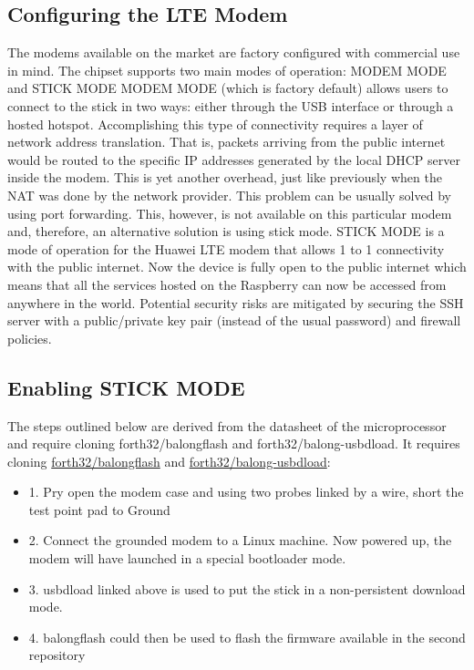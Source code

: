 \documentclass{IEEEtran}
\begin{document}
\subsection*{Configuring the LTE Modem}
The modems available on the market are factory configured with commercial use in mind. The chipset supports two main modes of operation: MODEM MODE and STICK MODE
\newline 
\newline
MODEM MODE (which is factory default) allows users to connect to the stick in two ways: either through the USB interface or through a hosted hotspot. Accomplishing this type of connectivity requires a layer of network address translation. That is, packets arriving from the public internet would be routed to the specific IP addresses generated by the local DHCP server inside the modem. This is yet another overhead, just like previously when the NAT was done by the network provider. This problem can be usually solved by using port forwarding. This, however, is not available on this particular modem and, therefore, an alternative solution is using stick mode.
\newline
\newline
STICK MODE is a mode of operation for the Huawei LTE modem that allows 1 to 1 connectivity with the public internet. Now the device is fully open to the public internet which means that all the services hosted on the Raspberry can now be accessed from anywhere in the world. Potential security risks are mitigated by securing the  SSH  server with a  public/private key pair  (instead of the usual password) and firewall policies.
\subsection*{Enabling STICK MODE}
The steps outlined below are derived from the datasheet of the microprocessor and require cloning forth32/balongflash and forth32/balong-usbdload. It requires cloning \hyperlink{https://github.com/forth32/balongflash}{forth32/balongflash} and \hyperlink{https://github.com/forth32/balong-usbdload}{forth32/balong-usbdload}:
\begin{itemize}
    \item[] 1. Pry open the modem case and using two probes linked by a wire, short the test point pad to Ground
    \item[] 2. Connect the grounded modem to a Linux machine. Now powered up, the modem will have launched in a special bootloader mode. 
    \item[] 3. usbdload linked above is used to put the stick in a non-persistent download mode.
    \item[] 4. balongflash could then be used to flash the firmware available in the second repository
\end{itemize}
\clearpage
\pagebreak
\end{document}
